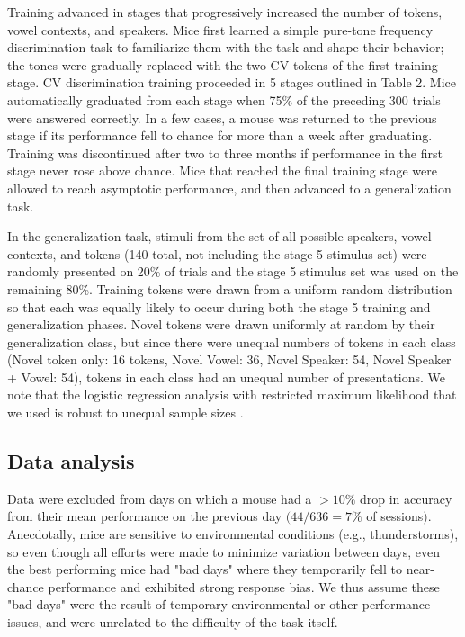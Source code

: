 Training advanced in stages that progressively increased the number of tokens, vowel contexts, and speakers. Mice first learned a simple pure-tone frequency discrimination task to familiarize them with the task and shape their behavior; the tones were gradually replaced with the two CV tokens of the first training stage. CV discrimination training proceeded in 5 stages outlined in Table 2. Mice automatically graduated from each stage when 75\% of the preceding 300 trials were answered correctly. In a few cases, a mouse was returned to the previous stage if its performance fell to chance for more than a week after graduating. Training was discontinued after two to three months if performance in the first stage never rose above chance. Mice that reached the final training stage were allowed to reach asymptotic performance, and then advanced to a generalization task.%

In the generalization task, stimuli from the set of all possible speakers, vowel contexts, and tokens (140 total, not including the stage 5 stimulus set) were randomly presented on 20\% of trials and the stage 5 stimulus set was used on the remaining 80\%. Training tokens were drawn from a uniform random distribution so that each was equally likely to occur during both the stage 5 training and generalization phases. Novel tokens were drawn uniformly at random by their generalization class, but since there were unequal numbers of tokens in each class (Novel token only: 16 tokens, Novel Vowel: 36, Novel Speaker: 54, Novel Speaker + Vowel: 54), tokens in each class had an unequal number of presentations. We note that the logistic regression analysis with restricted maximum likelihood that we used is robust to unequal sample sizes \citep{Patterson1971}.

\subsection{Data analysis}
Data were excluded from days on which a mouse had a $>10\%$ drop in accuracy from their mean performance on the previous day $(44/636 = 7\%$ of sessions$)$. Anecdotally, mice are sensitive to environmental conditions (e.g., thunderstorms), so even though all efforts were made to minimize variation between days, even the best performing mice had "bad days" where they temporarily fell to near-chance performance and exhibited strong response bias. We thus assume these "bad days" were the result of temporary environmental or other performance issues, and were unrelated to the difficulty of the task itself. 

